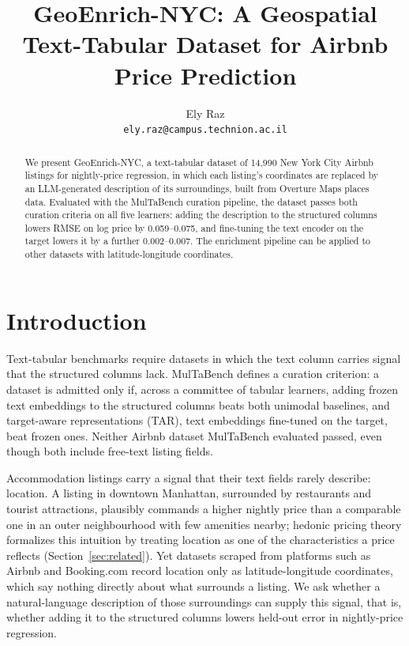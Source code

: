 \documentclass{article}
\title{GeoEnrich-NYC: A Geospatial Text-Tabular Dataset for Airbnb Price Prediction}
\author{%
  Ely Raz\\
  \texttt{ely.raz@campus.technion.ac.il} \\
}
\begin{document}
\maketitle


\begin{abstract}
  We present GeoEnrich-NYC, a text-tabular dataset of 14,990 New York City Airbnb listings for nightly-price regression,
  in which each listing's coordinates are replaced by an LLM-generated description of its surroundings,
  built from Overture Maps places data.
  Evaluated with the MulTaBench curation pipeline, the dataset passes both curation criteria on all five learners:
  adding the description to the structured columns lowers RMSE on log price by 0.059--0.075,
  and fine-tuning the text encoder on the target lowers it by a further 0.002--0.007.
  The enrichment pipeline can be applied to other datasets with latitude-longitude coordinates.
\end{abstract}


\section{Introduction}

Text-tabular benchmarks require datasets in which the text column carries signal that the structured columns lack.
MulTaBench \citep{arazi2026multabench} defines a curation criterion: a dataset is admitted only if,
across a committee of tabular learners, adding frozen text embeddings to the structured columns beats both unimodal baselines,
and target-aware representations (TAR), text embeddings fine-tuned on the target, beat frozen ones.
Neither Airbnb dataset MulTaBench evaluated passed, even though both include free-text listing fields.

Accommodation listings carry a signal that their text fields rarely describe: location.
A listing in downtown Manhattan, surrounded by restaurants and tourist attractions, plausibly commands
a higher nightly price than a comparable one in an outer neighbourhood with few amenities nearby;
hedonic pricing theory formalizes this intuition by treating location as one of the characteristics a price reflects
(Section~\ref{sec:related}).
Yet datasets scraped from platforms such as Airbnb and Booking.com record location only as latitude-longitude coordinates,
which say nothing directly about what surrounds a listing.
We ask whether a natural-language description of those surroundings can supply this signal,
that is, whether adding it to the structured columns lowers held-out error in nightly-price regression.
\end{document}
